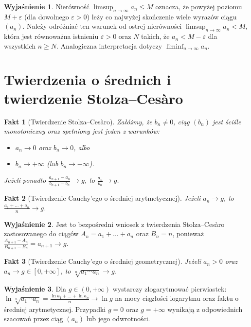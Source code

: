 \documentclass[11pt, a4paper]{article}
\theoremstyle{plain}
\newtheorem{fakt}{Fakt}
\theoremstyle{definition}
\newtheorem*{wyjasnienie}{Wyjaśnienie}
\begin{document}
\begin{wyjasnienie}
Nierówność $\limsup_{n\to\infty} a_n \leqslant M$ oznacza, że powyżej poziomu $M + \varepsilon$ (dla dowolnego $\varepsilon > 0$) leży co najwyżej skończenie wiele wyrazów ciągu $(a_n)$. Należy odróżniać ten warunek od ostrej nierówności $\limsup_{n\to\infty} a_n < M$, która jest równoważna istnieniu $\varepsilon > 0$ oraz $N$ takich, że $a_n < M - \varepsilon$ dla wszystkich $n \geqslant N$. Analogiczna interpretacja dotyczy $\liminf_{n\to\infty} a_n$.
\end{wyjasnienie}

\section{Twierdzenia o średnich i twierdzenie Stolza--Cesàro}

\begin{fakt}[Twierdzenie Stolza--Cesàro]
Załóżmy, że $b_n \neq 0$, ciąg $(b_n)$ jest ściśle monotoniczny oraz spełniony jest jeden z warunków:
\begin{itemize}
    \item $a_n \to 0$ oraz $b_n \to 0$, albo
    \item $b_n \to +\infty$ (lub $b_n \to -\infty$).
\end{itemize}
Jeżeli ponadto $\frac{a_{n+1} - a_n}{b_{n+1} - b_n} \to g$, to $\frac{a_n}{b_n} \to g$.
\end{fakt}

\begin{fakt}[Twierdzenie Cauchy'ego o średniej arytmetycznej]
Jeżeli $a_n \to g$, to $\frac{a_1 + \dots + a_n}{n} \to g$.
\end{fakt}

\begin{wyjasnienie}
Jest to bezpośredni wniosek z twierdzenia Stolza--Cesàro zastosowanego do ciągów $A_n = a_1 + \dots + a_n$ oraz $B_n = n$, ponieważ $\frac{A_{n+1} - A_n}{B_{n+1} - B_n} = a_{n+1} \to g$.
\end{wyjasnienie}

\begin{fakt}[Twierdzenie Cauchy'ego o średniej geometrycznej]
Jeżeli $a_n > 0$ oraz $a_n \to g \in [0, +\infty]$, to $\sqrt[n]{a_1 \cdots a_n} \to g$.
\end{fakt}

\begin{wyjasnienie}
Dla $g \in (0, +\infty)$ wystarczy zlogarytmować pierwiastek: $\ln \sqrt[n]{a_1 \cdots a_n} = \frac{\ln a_1 + \dots + \ln a_n}{n} \to \ln g$ na mocy ciągłości logarytmu oraz faktu o średniej arytmetycznej. Przypadki $g = 0$ oraz $g = +\infty$ wynikają z odpowiednich szacowań przez ciąg $(a_n)$ lub jego odwrotności.
\end{wyjasnienie}
\end{document}
